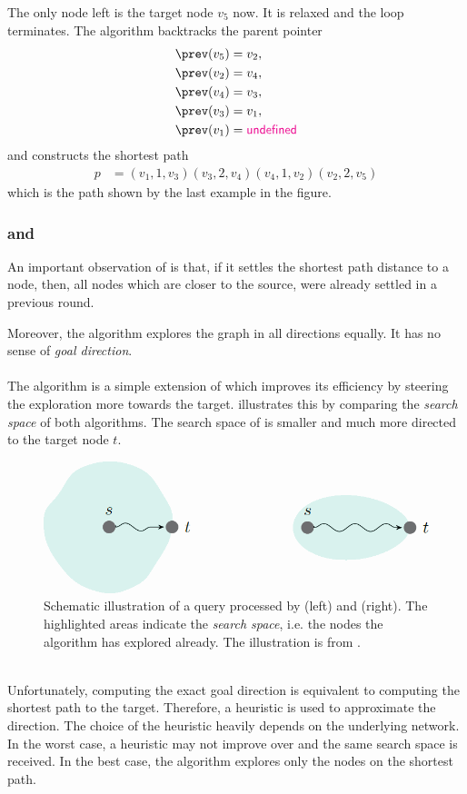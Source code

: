 	The only node left is the target node $v_5$ now. It is relaxed and the loop terminates.
	The algorithm backtracks the parent pointer
	\begin{align*}
		\prev(v_5)	&= v_2,\\
		\prev(v_2)	&= v_4,\\
		\prev(v_4)	&= v_3,\\
		\prev(v_3)	&= v_1,\\
		\prev(v_1)	&= \vundef
	\end{align*}
	and constructs the shortest path
	\begin{align*}
		p	&= (v_1, 1, v_3)(v_3, 2, v_4)(v_4, 1, v_2)(v_2, 2, v_5)
	\end{align*}
	which is the path shown by the last example in the figure.

\subsubsection{\astar and \alt}\label{alt}
	An important observation of \dijkstra is that, if it settles the shortest path distance to a node, then,
	all nodes which are closer to the source, were already settled in a previous round.
	
	Moreover, the algorithm explores the graph in all directions equally. It has no sense of \textit{goal direction}.\\\\
	The \astar algorithm  is a simple extension of \dijkstra which improves its efficiency by steering the
	exploration more towards the target.  illustrates this by comparing the \textit{search space}
	of both algorithms. The search space of \astar is smaller and much more directed to the target node $t$.
	\begin{figure}[!ht]
		 \begin{center}
			\includegraphics[scale=0.5]{res/dijkstra_vs_astar}
		\end{center}
		\caption{Schematic illustration of a query processed by \dijkstra (left) and \astar (right).
			The highlighted areas indicate the \textit{search space}, i.e. the nodes the algorithm has explored already.
			The illustration is from .}
		\label{dijkstra_vs_astar}
	\end{figure}\quad\\
	Unfortunately, computing the exact goal direction is equivalent to computing the shortest path to the target.
	Therefore, a heuristic is used to approximate the direction. The choice of the heuristic heavily depends on the underlying network.
	In the worst case, a heuristic may not improve over \dijkstra and the same search space is received. In the best case,
	the algorithm explores only the nodes on the shortest path.
	
